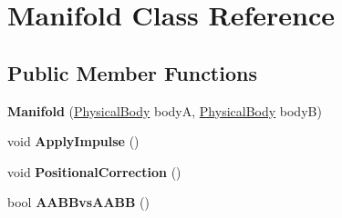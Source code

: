 \hypertarget{class_manifold}{}\section{Manifold Class Reference}
\label{class_manifold}
\subsection*{Public Member Functions}
\begin{DoxyCompactItemize}
\item 
\mbox{\label{class_manifold_a7a30f055ee040a7ac00284fb08b3c347}} 
{\bfseries Manifold} (\mbox{\hyperlink{class_physical_body}{Physical\+Body}} bodyA, \mbox{\hyperlink{class_physical_body}{Physical\+Body}} bodyB)
\item 
\mbox{\label{class_manifold_a27080a445e565949f9e15b8fea69f6c0}} 
void {\bfseries Apply\+Impulse} ()
\item 
\mbox{\label{class_manifold_a9d3187192136eac849265f7d386f617e}} 
void {\bfseries Positional\+Correction} ()
\item 
\mbox{\label{class_manifold_a09f7dd163c965856905247bb15a1ee99}} 
bool {\bfseries A\+A\+B\+Bvs\+A\+A\+BB} ()
\end{DoxyCompactItemize}
